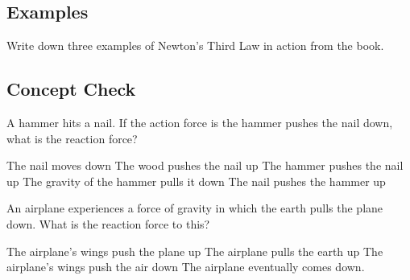 \documentclass[10pt]{exam}
\begin{document}
\shadowbox{\TheSbox}

\subsection*{Examples}
Write down three examples of Newton's Third Law in action from the book.

\vs

\subsection*{Concept Check}

A hammer hits a nail. If the action force is the hammer pushes the nail down, what is the reaction force?

\hfill

\begin{checkboxes}
  \choice The nail moves down
  \choice The wood pushes the nail up
  \choice The hammer pushes the nail up
  \choice The gravity of the hammer pulls it down
  \correctchoice The nail pushes the hammer up
\end{checkboxes}

\hfill

\hfill

\noindent
An airplane experiences a force of gravity in which the earth pulls the plane down.  What is the reaction force to this?

\hfill

\begin{checkboxes}
  \choice The airplane's wings push the plane up
  \correctchoice The airplane pulls the earth up
  \choice The airplane's wings push the air down
  \choice The airplane eventually comes down.
\end{checkboxes}

\pagebreak \hfill
\end{document}

